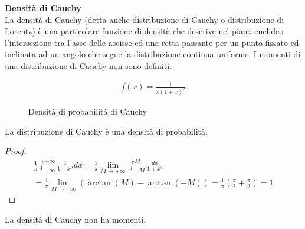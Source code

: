 \begin{defn}
    \textbf{Densità di Cauchy} \\
    La densità di Cauchy (detta anche distribuzione di Cauchy o distribuzione di
    Lorentz) è una particolare funzione di densità che descrive nel piano
    euclideo l'intersezione tra l'asse delle ascisse ed una retta passante per
    un punto fissato ed inclinata ad un angolo che segue la distribuzione
    continua uniforme. I momenti di una distribuzione di Cauchy non sono
    definiti.

    \begin{equation*}
        \begin{aligned}
            f(x) = \frac{1}{\pi (1+x)^2}
        \end{aligned}
    \end{equation*}


    \begin{figure}[htbp]
        \centering

        \caption{Densità di probabilità di Cauchy}
        \label{cauchy}
    \end{figure}


    \begin{prop}
        La distribuzione di Cauchy è una densità di probabilità.
    \end{prop}

    \begin{proof}
        \begin{equation*}
            \begin{aligned}
                \frac{1}{\pi} \int_{-\infty}^{+\infty} \frac{1}{1 + x^2} dx = \frac{1}{\pi} \lim_{M \to +\infty} \int_{-M}^{M} \frac{dx}{1 + x^2} \\
                = \frac{1}{\pi} \lim_{M \to +\infty} \left( \arctan(M) - \arctan(-M) \right) = \frac{1}{\pi} \left( \frac{\pi}{2} + \frac{\pi}{2} \right) = 1
            \end{aligned}
        \end{equation*}
    \end{proof}

    \begin{prop}
        La densità di Cauchy non ha momenti.
    \end{prop}


\end{defn}
